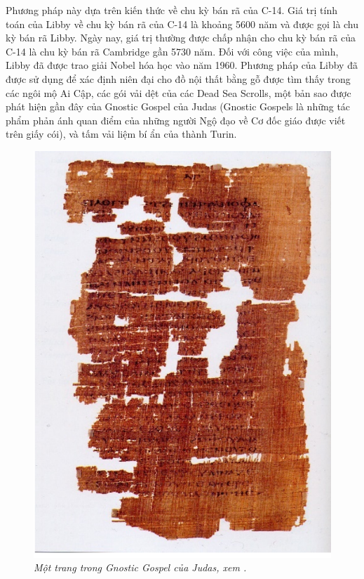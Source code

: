 Phương pháp này dựa trên kiến    thức về chu kỳ bán rã của C-14. Giá trị tính toán của Libby về chu kỳ bán rã của C-14 là khoảng 5600 năm và được gọi là chu kỳ bán rã Libby. Ngày nay, giá trị thường được chấp nhận cho chu kỳ bán rã của C-14 là chu kỳ bán rã Cambridge gần 5730 năm. Đối với công việc của mình, Libby đã được trao giải Nobel hóa học vào năm 1960. Phương pháp của Libby đã được sử dụng để xác định niên đại cho đồ nội thất bằng gỗ được tìm thấy trong các ngôi mộ Ai Cập, các gói vải dệt của các Dead Sea Scrolls, một bản sao được phát hiện gần đây của Gnostic Gospel của Judas (Gnostic Gospels là những tác phẩm phản ánh quan điểm của những người Ngộ đạo về Cơ đốc giáo được viết trên giấy cói), và tấm vải liệm bí ẩn của thành Turin.
\begin{figure}[H]
	\centering
	\includegraphics[scale=0.5]{Images/hinh_2_4.png}
	\caption[. Một trang trong Gnostic Gospel của Judas, xem \cite{ref4}]{\itshape\fontsize{13pt}{0pt}\selectfont\centering Một trang trong Gnostic Gospel của Judas, xem \cite{ref4}.}
	\label{hinh2.4}
\end{figure}

